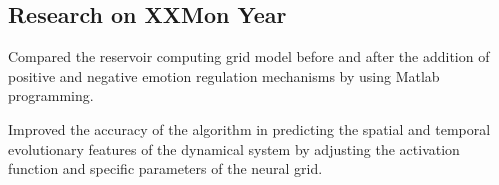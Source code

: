 \documentclass[a4paper, 12pt]{article}
\begin{document}
\subsection {{Research on XX}\hfill Mon Year}
\begin{zitemize}
\item Compared the reservoir computing grid model before and after the addition of positive and negative emotion regulation mechanisms by using Matlab programming.
\item Improved the accuracy of the algorithm in predicting the spatial and temporal evolutionary features of the dynamical system by adjusting the activation function and specific parameters of the neural grid.
\end{zitemize}
\end{document}

